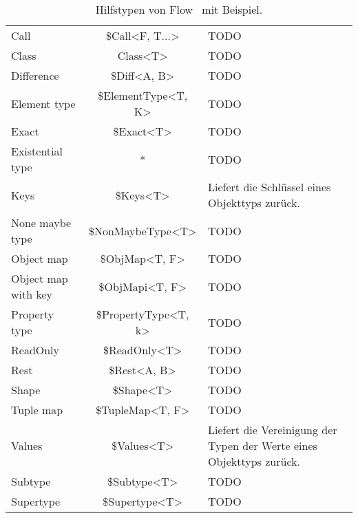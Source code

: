 \begin{longtabuenv}
\begin{longtabu} to 
  \midrule
   &  &  \\
  \midrule
\endhead
  \midrule
  \caption{Hilfstypen von Flow~\autocite{FLOW:UTILITY_TYPES} mit Beispiel.}
\endfoot
  Call                & \$Call<F, T...>        & TODO   \medskip\\
  Class               & Class<T>               & TODO   \medskip\\
  Difference          & \$Diff<A, B>           & TODO   \medskip\\
  Element type        & \$ElementType<T, K>    & TODO   \medskip\\
  Exact               & \$Exact<T>             & TODO   \medskip\\
  Existential type    & *                      & TODO   \medskip\\
  Keys                & \$Keys<T>              & Liefert die Schlüssel eines Objekttyps zurück. \medskip\\
  None maybe type     & \$NonMaybeType<T>      & TODO   \medskip\\
  Object map          & \$ObjMap<T, F>         & TODO   \medskip\\
  Object map with key & \$ObjMapi<T, F>        & TODO   \medskip\\
  Property type       & \$PropertyType<T, k>   & TODO   \medskip\\
  ReadOnly            & \$ReadOnly<T>          & TODO   \medskip\\
  Rest                & \$Rest<A, B>           & TODO   \medskip\\
  Shape               & \$Shape<T>             & TODO   \medskip\\
  Tuple map           & \$TupleMap<T, F>       & TODO   \medskip\\
  Values              & \$Values<T>            & Liefert die Vereinigung der Typen der Werte eines Objekttyps zurück. \medskip\\
  Subtype             & \$Subtype<T>           & TODO   \medskip\\
  Supertype           & \$Supertype<T>         & TODO   \medskip
  \label{tab:flow-utility-types}
\end{longtabu}
\end{longtabuenv}
